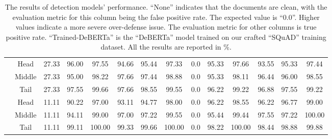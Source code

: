 \begin{table*}[h]
{\begin{tabular}{cccccccccccccc}
\midrule
{} 
    & Head     & 27.33 & 96.00	&97.55&	94.66&	95.44&	97.33    & 0.0  & 95.33  & 97.66  & 93.55  & 95.33  & 97.44    \\
    & Middle & 27.33 & 95.00	&98.22&	97.66&	97.44&	98.88    & 0.0  & 95.33  & 98.11  & 96.44  & 96.00  & 98.55    \\
    & Tail & 27.33 & 97.55	&99.66&	97.66&	98.55&	99.55    & 0.0   & 96.22  & 99.22  & 96.88  & 97.55   &  99.22 \\
\midrule
{} 
    & Head     & 11.11 &90.22	&97.00&93.11&	94.77&	98.00    & 0.0 & 96.22  & 98.55  & 96.22  & 96.77 & 99.00    \\
    & Middle & 11.11 &94.11	&99.00&97.00&	97.22&	99.55  & 0.0 & 95.44  & 99.44  & 97.55  & 97.22 & 100.00    \\
    & Tail & 11.11 &99.11	&100.00&99.33&	99.66&	100.00    & 0.0 & 98.22  & 100.00  & 98.44  & 98.88 & 99.88    \\


\bottomrule
\end{tabular}
}
\caption{The results of detection models' performance. ``None'' indicates that the documents are clean, with the evaluation metric for this column being the false positive rate. The expected value is ``0.0''. Higher values indicate a more severe over-defense issue. The evaluation metric for other columns is true positive rate.  ``Trained-DeBERTa'' is the ``DeBERTa'' model trained on our crafted ``SQuAD'' training dataset.  All the results are reported in \%.}
\label{tab:detection-general}
\vspace{-15pt}
\end{table*}


